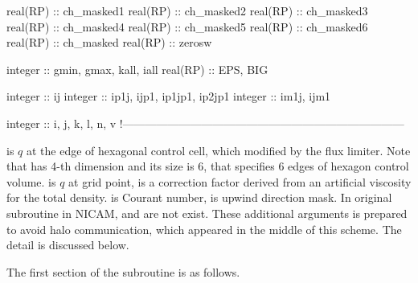 \begin{LstF90}[name=horizontal_limiter_thuburn]
  real(RP) :: ch_masked1
  real(RP) :: ch_masked2
  real(RP) :: ch_masked3
  real(RP) :: ch_masked4
  real(RP) :: ch_masked5
  real(RP) :: ch_masked6
  real(RP) :: ch_masked
  real(RP) :: zerosw

  integer  :: gmin, gmax, kall, iall
  real(RP) :: EPS, BIG

  integer  :: ij
  integer  :: ip1j, ijp1, ip1jp1, ip2jp1
  integer  :: im1j, ijm1

  integer  :: i, j, k, l, n, v
  !---------------------------------------------------------------------------

\end{LstF90}
%
 is $q$ at the edge of hexagonal control cell, which modified by the flux limiter.
%
Note that  has 4-th dimension and its size is 6, that specifies
6 edges of hexagon control volume.
%
 is $q$ at grid point,
%
 is a correction factor derived from an artificial viscosity for the total density.
%
 is Courant number,  is upwind direction mask.
%
In original subroutine in NICAM,  and  are not exist.
These additional arguments is prepared to avoid halo communication, which appeared in the middle of this scheme.
The detail is discussed below.

The first section of the subroutine is as follows.


